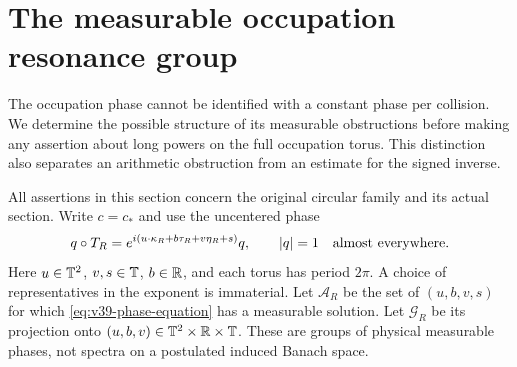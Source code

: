 \section{The measurable occupation resonance group}
\label{sec:v39-resonance-group}
The occupation phase cannot be identified with a constant phase per
collision. We determine the possible structure of its measurable
obstructions before making any assertion about long powers on the full
occupation torus. This distinction also separates an arithmetic
obstruction from an estimate for the signed inverse.

All assertions in this section concern the original circular family
and its actual section. Write $c=c_*$ and use the uncentered phase
\begin{equation}\label{eq:v39-phase-equation}
 q\circ T_R=e^{i(u\cdot\kappa_R+b\tau_R+v\eta_R+s)}q,
 \qquad |q|=1\quad\hbox{almost everywhere}.
\end{equation}
Here $u\in\mathbb T^2$, $v,s\in\mathbb T$, $b\in\mathbb R$, and each torus has period
$2\pi$. A choice of representatives in the exponent is immaterial.
Let $\mathcal A_R$ be the set of $(u,b,v,s)$ for which
\eqref{eq:v39-phase-equation} has a measurable solution. Let $\mathcal G_R$
be its projection onto $(u,b,v)\in\mathbb T^2\times\mathbb R\times\mathbb T$.
These are groups of physical measurable phases, not spectra on a
postulated induced Banach space.

